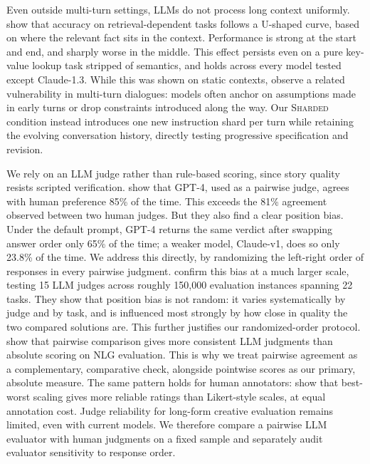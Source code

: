Even outside multi-turn settings, LLMs do not process long context uniformly. \citet{liu2023lostmiddlelanguagemodels} show that accuracy on retrieval-dependent tasks follows a U-shaped curve, based on where the relevant fact sits in the context. Performance is strong at the start and end, and sharply worse in the middle. This effect persists even on a pure key-value lookup task stripped of semantics, and holds across every model tested except Claude-1.3. While this was shown on static contexts, \citet{laban2025llmslostmultiturnconversation} observe a related vulnerability in multi-turn dialogues: models often anchor on assumptions made in early turns or drop constraints introduced along the way. Our \textsc{Sharded} condition instead introduces one new instruction shard per turn while retaining the evolving conversation history, directly testing progressive specification and revision.

We rely on an LLM judge rather than rule-based scoring, since story quality resists scripted verification. \citet{zheng2023judgingllmasajudgemtbenchchatbot} show that GPT-4, used as a pairwise judge, agrees with human preference 85\% of the time. This exceeds the 81\% agreement observed between two human judges. But they also find a clear position bias. Under the default prompt, GPT-4 returns the same verdict after swapping answer order only 65\% of the time; a weaker model, Claude-v1, does so only 23.8\% of the time. We address this directly, by randomizing the left-right order of responses in every pairwise judgment. \citet{shi-etal-2025-judging} confirm this bias at a much larger scale, testing 15 LLM judges across roughly 150{,}000 evaluation instances spanning 22 tasks. They show that position bias is not random: it varies systematically by judge and by task, and is influenced most strongly by how close in quality the two compared solutions are. This further justifies our randomized-order protocol. \citet{liusie-etal-2024-llm} show that pairwise comparison gives more consistent LLM judgments than absolute scoring on NLG evaluation. This is why we treat pairwise agreement as a complementary, comparative check, alongside pointwise scores as our primary, absolute measure. The same pattern holds for human annotators: \citet{kiritchenko-mohammad-2017-best} show that best-worst scaling gives more reliable ratings than Likert-style scales, at equal annotation cost. Judge reliability for long-form creative evaluation remains limited, even with current models. We therefore compare a pairwise LLM evaluator with human judgments on a fixed sample and separately audit evaluator sensitivity to response order.
